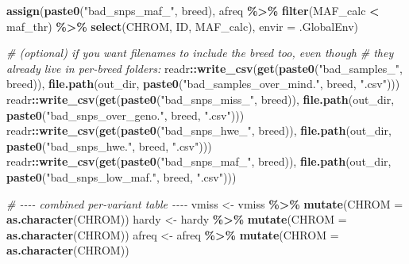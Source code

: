 \documentclass[
]{article}
\newenvironment{Shaded}{\begin{snugshade}}{\end{snugshade}}
\newcommand{\AttributeTok}[1]{\textcolor[rgb]{0.13,0.29,0.53}{#1}}
\newcommand{\CommentTok}[1]{\textcolor[rgb]{0.56,0.35,0.01}{\textit{#1}}}
\newcommand{\FunctionTok}[1]{\textcolor[rgb]{0.13,0.29,0.53}{\textbf{#1}}}
\newcommand{\NormalTok}[1]{#1}
\newcommand{\OtherTok}[1]{\textcolor[rgb]{0.56,0.35,0.01}{#1}}
\newcommand{\SpecialCharTok}[1]{\textcolor[rgb]{0.81,0.36,0.00}{\textbf{#1}}}
\newcommand{\StringTok}[1]{\textcolor[rgb]{0.31,0.60,0.02}{#1}}
\begin{document}
\begin{Shaded}
\begin{Highlighting}[]
  \FunctionTok{assign}\NormalTok{(}\FunctionTok{paste0}\NormalTok{(}\StringTok{"bad\_snps\_maf\_"}\NormalTok{,  breed),}
\NormalTok{         afreq }\SpecialCharTok{\%\textgreater{}\%} \FunctionTok{filter}\NormalTok{(MAF\_calc }\SpecialCharTok{\textless{}}\NormalTok{ maf\_thr) }\SpecialCharTok{\%\textgreater{}\%} \FunctionTok{select}\NormalTok{(CHROM, ID, MAF\_calc),}
         \AttributeTok{envir =}\NormalTok{ .GlobalEnv)}
  
  \CommentTok{\# (optional) if you want filenames to include the breed too, even though}
  \CommentTok{\# they already live in per{-}breed folders:}
\NormalTok{  readr}\SpecialCharTok{::}\FunctionTok{write\_csv}\NormalTok{(}\FunctionTok{get}\NormalTok{(}\FunctionTok{paste0}\NormalTok{(}\StringTok{"bad\_samples\_"}\NormalTok{,   breed)), }\FunctionTok{file.path}\NormalTok{(out\_dir, }\FunctionTok{paste0}\NormalTok{(}\StringTok{"bad\_samples\_over\_mind."}\NormalTok{, breed, }\StringTok{".csv"}\NormalTok{)))}
\NormalTok{  readr}\SpecialCharTok{::}\FunctionTok{write\_csv}\NormalTok{(}\FunctionTok{get}\NormalTok{(}\FunctionTok{paste0}\NormalTok{(}\StringTok{"bad\_snps\_miss\_"}\NormalTok{, breed)), }\FunctionTok{file.path}\NormalTok{(out\_dir, }\FunctionTok{paste0}\NormalTok{(}\StringTok{"bad\_snps\_over\_geno."}\NormalTok{, breed, }\StringTok{".csv"}\NormalTok{)))}
\NormalTok{  readr}\SpecialCharTok{::}\FunctionTok{write\_csv}\NormalTok{(}\FunctionTok{get}\NormalTok{(}\FunctionTok{paste0}\NormalTok{(}\StringTok{"bad\_snps\_hwe\_"}\NormalTok{,  breed)), }\FunctionTok{file.path}\NormalTok{(out\_dir, }\FunctionTok{paste0}\NormalTok{(}\StringTok{"bad\_snps\_hwe."}\NormalTok{, breed, }\StringTok{".csv"}\NormalTok{)))}
\NormalTok{  readr}\SpecialCharTok{::}\FunctionTok{write\_csv}\NormalTok{(}\FunctionTok{get}\NormalTok{(}\FunctionTok{paste0}\NormalTok{(}\StringTok{"bad\_snps\_maf\_"}\NormalTok{,  breed)), }\FunctionTok{file.path}\NormalTok{(out\_dir, }\FunctionTok{paste0}\NormalTok{(}\StringTok{"bad\_snps\_low\_maf."}\NormalTok{, breed, }\StringTok{".csv"}\NormalTok{)))}
  
  
  \CommentTok{\# {-}{-}{-}{-} combined per{-}variant table {-}{-}{-}{-}}
\NormalTok{  vmiss }\OtherTok{\textless{}{-}}\NormalTok{ vmiss }\SpecialCharTok{\%\textgreater{}\%} \FunctionTok{mutate}\NormalTok{(}\AttributeTok{CHROM =} \FunctionTok{as.character}\NormalTok{(CHROM))}
\NormalTok{  hardy }\OtherTok{\textless{}{-}}\NormalTok{ hardy }\SpecialCharTok{\%\textgreater{}\%} \FunctionTok{mutate}\NormalTok{(}\AttributeTok{CHROM =} \FunctionTok{as.character}\NormalTok{(CHROM))}
\NormalTok{  afreq }\OtherTok{\textless{}{-}}\NormalTok{ afreq }\SpecialCharTok{\%\textgreater{}\%} \FunctionTok{mutate}\NormalTok{(}\AttributeTok{CHROM =} \FunctionTok{as.character}\NormalTok{(CHROM))}
  

\end{Highlighting}
\end{Shaded}
\end{document}
